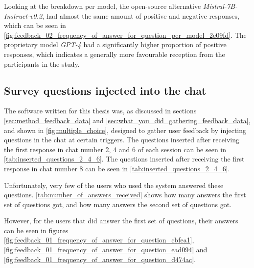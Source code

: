 Looking at the breakdown per model, the open-source alternative \textit{Mistral-7B-Instruct-v0.2}, had almost the same amount of positive and negative responses, which can be seen in \autoref{fig:feedback_02_frequency_of_answer_for_question_per_model_2e09fd}. The proprietary model \textit{GPT-4} had a significantly higher proportion of positive responses, which indicates a generally more favourable reception from the participants in the study.








\subsection{Survey questions injected into the chat}
\label{sec:survey_questions_injected_into_the_chat}


The software written for this thesis was, as discussed in sections \ref{sec:method_feedback_data} and \ref{sec:what_you_did_gathering_feedback_data}, and shown in \autoref{fig:multiple_choice}, designed to gather user feedback by injecting questions in the chat at certain triggers. The questions inserted after receiving the first response in chat number 2, 4 and 6 of each session can be seen in \autoref{tab:inserted_questions_2_4_6}. The questions inserted after receiving the first response in chat number 8 can be seen in \autoref{tab:inserted_questions_2_4_6}.


Unfortunately, very few of the users who used the system answered these questions. \autoref{tab:number_of_answers_received} shows how many answers the first set of questions got, and how many answers the second set of questions got.


However, for the users that did answer the first set of questions, their answers can be seen in figures \ref{fig:feedback_01_frequency_of_answer_for_question_cbfea1}, \ref{fig:feedback_01_frequency_of_answer_for_question_ead094} and \ref{fig:feedback_01_frequency_of_answer_for_question_d474ac}.














